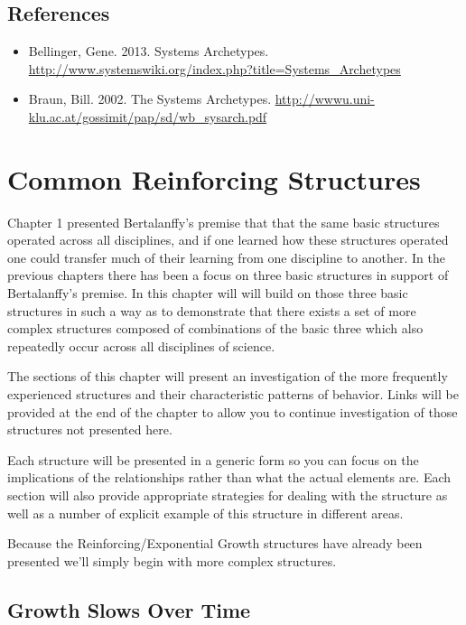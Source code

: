 \documentclass[]{memoir}
\begin{document}
\section{References}

\begin{itemize}
\itemsep1pt\parskip0pt
\item
  Bellinger, Gene. 2013. Systems Archetypes.
  \url{http://www.systemswiki.org/index.php?title=Systems_Archetypes}
\item
  Braun, Bill. 2002. The Systems Archetypes.
  \url{http://wwwu.uni-klu.ac.at/gossimit/pap/sd/wb_sysarch.pdf}
\end{itemize}

\chapter{Common Reinforcing Structures}

Chapter 1 presented Bertalanffy's premise that that the same basic
structures operated across all disciplines, and if one learned how these
structures operated one could transfer much of their learning from one
discipline to another. In the previous chapters there has been a focus
on three basic structures in support of Bertalanffy's premise. In this
chapter will will build on those three basic structures in such a way as
to demonstrate that there exists a set of more complex structures
composed of combinations of the basic three which also repeatedly occur
across all disciplines of science.

The sections of this chapter will present an investigation of the more
frequently experienced structures and their characteristic patterns of
behavior. Links will be provided at the end of the chapter to allow you
to continue investigation of those structures not presented here.

Each structure will be presented in a generic form so you can focus on
the implications of the relationships rather than what the actual
elements are. Each section will also provide appropriate strategies for
dealing with the structure as well as a number of explicit example of
this structure in different areas.

Because the Reinforcing/Exponential Growth structures have already been
presented we'll simply begin with more complex structures.

\section{Growth Slows Over Time}
\end{document}

